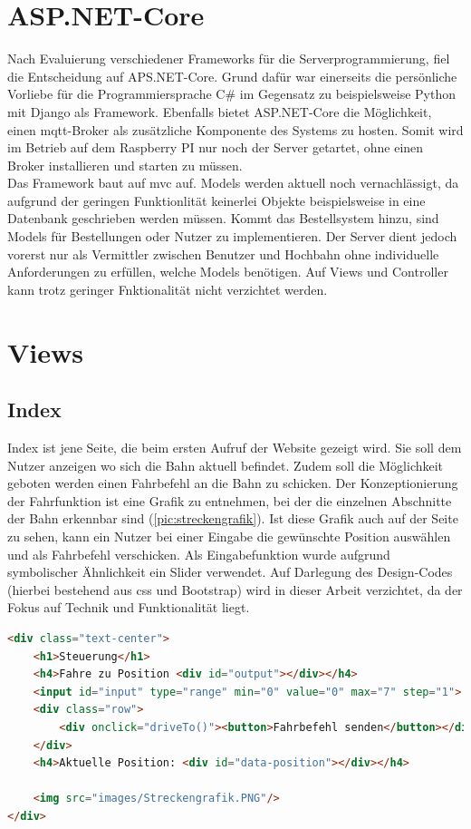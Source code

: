 \section{ASP.NET-Core}
Nach Evaluierung verschiedener Frameworks für die Serverprogrammierung, fiel die Entscheidung auf APS.NET-Core. Grund dafür war einerseits die persönliche Vorliebe für die Programmiersprache C\# im Gegensatz zu beispielsweise Python mit Django als Framework. Ebenfalls bietet ASP.NET-Core die Möglichkeit, einen \acrshort{mqtt}-Broker als zusätzliche Komponente des Systems zu hosten. Somit wird im Betrieb auf dem Raspberry PI nur noch der Server getartet, ohne einen Broker installieren und starten zu müssen. \\
Das Framework baut auf \acrfull{mvc} auf. Models werden aktuell noch vernachlässigt, da aufgrund der geringen Funktionlität keinerlei Objekte beispielsweise in eine Datenbank geschrieben werden müssen. Kommt das Bestellsystem hinzu, sind Models für Bestellungen oder Nutzer zu implementieren. Der Server dient jedoch vorerst nur als Vermittler zwischen Benutzer und Hochbahn ohne individuelle Anforderungen zu erfüllen, welche Models benötigen. Auf Views und Controller kann trotz geringer Fnktionalität nicht verzichtet werden. 

\section{Views}
\subsection{Index}
Index ist jene Seite, die beim ersten Aufruf der Website gezeigt wird. Sie soll dem Nutzer anzeigen wo sich die Bahn aktuell befindet. Zudem soll die Möglichkeit geboten werden einen Fahrbefehl an die Bahn zu schicken. Der Konzeptionierung der Fahrfunktion ist eine Grafik zu entnehmen, bei der die einzelnen Abschnitte der Bahn erkennbar sind (\autoref{pic:streckengrafik}). Ist diese Grafik auch auf der Seite zu sehen, kann ein Nutzer bei einer Eingabe die gewünschte Position auswählen und als Fahrbefehl verschicken. Als Eingabefunktion wurde aufgrund symbolischer Ähnlichkeit ein Slider verwendet. Auf Darlegung des Design-Codes (hierbei bestehend aus css und Bootstrap) wird in dieser Arbeit verzichtet, da der Fokus auf Technik und Funktionalität liegt. 
\vspace{1cm}

\begin{lstlisting}[language=html, style=dhpaperdefault]
<div class="text-center">
    <h1>Steuerung</h1>
    <h4>Fahre zu Position <div id="output"></div></h4>
    <input id="input" type="range" min="0" value="0" max="7" step="1">
    <div class="row">
        <div onclick="driveTo()"><button>Fahrbefehl senden</button></div>
    </div>
    <h4>Aktuelle Position: <div id="data-position"></div></h4>

	<img src="images/Streckengrafik.PNG"/>
</div>
\end{lstlisting}
\vspace{0.5cm}

